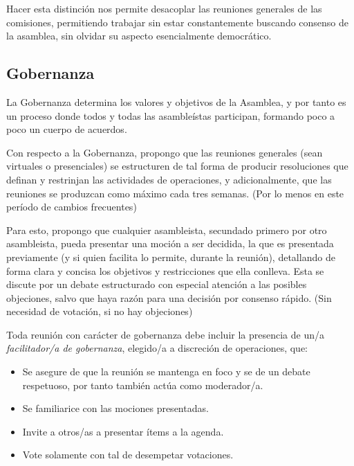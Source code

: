 \documentclass[justified]{tufte-handout} %
\begin{document}
Hacer esta distinción nos permite desacoplar las reuniones generales de las comisiones, permitiendo trabajar sin estar constantemente buscando consenso de la asamblea, sin olvidar su aspecto esencialmente democrático.

\subsection{Gobernanza}
La Gobernanza determina los valores y objetivos de la Asamblea, y por tanto es un proceso donde todos y todas las asambleístas participan, formando poco a poco un cuerpo de acuerdos.

Con respecto a la Gobernanza, propongo que las reuniones generales (sean virtuales o presenciales) se estructuren de tal forma de producir resoluciones que definan y restrinjan las actividades de operaciones, y adicionalmente, que las reuniones se produzcan como máximo cada tres semanas. (Por lo menos en este período de cambios frecuentes)

Para esto, propongo que cualquier asambleista, secundado primero por otro asambleista, pueda presentar una moción a ser decidida, la que es presentada previamente (y si quien facilita lo permite, durante la reunión), detallando de forma clara y concisa los objetivos y restricciones que ella conlleva. Esta se discute por un debate estructurado con especial atención a las posibles objeciones, salvo que haya razón para una decisión por consenso rápido. (Sin necesidad de votación, si no hay objeciones)

Toda reunión con carácter de gobernanza debe incluir la presencia de un/a \textit{facilitador/a de gobernanza}, elegido/a a discreción de operaciones, que:

\begin{itemize}
	\item Se asegure de que la reunión se mantenga en foco y se de un debate respetuoso, por tanto también actúa como moderador/a.
	\item Se familiarice con las mociones presentadas.
	\item Invite a otros/as a presentar ítems a la agenda.
	\item Vote solamente con tal de desempetar votaciones.
\end{itemize}
\end{document}
